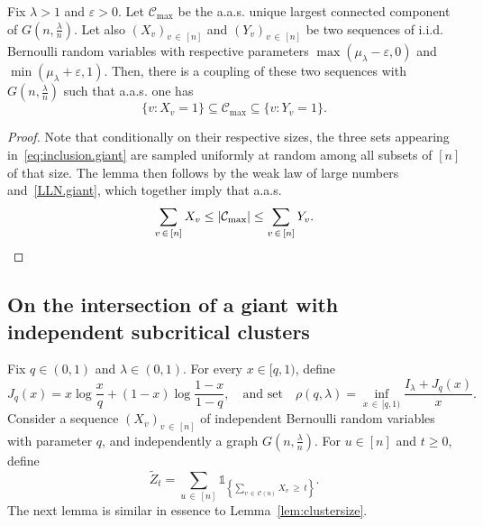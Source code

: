 \documentclass[AHL,Unicode,longabstracts,published]{cedram}
\newcommand{\cC}{\mathcal{C}}
\begin{document}
\begin{lemm}\label{lem:stoch.giant}
Fix $\lambda>1$ and $\varepsilon>0$. Let $\cC_{\max}$ be the a.a.s. unique largest connected component of $G(n,\frac \lambda n)$. Let also $(X_v)_{v\,\in\,[n]}$ and $(Y_v)_{v\,\in\,[n]}$ be two sequences of i.i.d. Bernoulli random variables with respective parameters $\max(\mu_\lambda-\varepsilon,0)$ and $\min(\mu_\lambda+\varepsilon,1)$. Then, there is a coupling of these two sequences with $G(n,\tfrac{\lambda}n)$ such that a.a.s. one has
\begin{equation}\label{eq:inclusion.giant}
\{v : X_v=1\} \subseteq \cC_{\max} \subseteq \{v : Y_v=1\}.
\end{equation}
\end{lemm}

\begin{proof}
Note that conditionally on their respective sizes, the three sets appearing in~\eqref{eq:inclusion.giant} are sampled uniformly at random among all subsets of $[n]$ of that size. The lemma then follows by the weak law of large numbers and~\eqref{LLN.giant}, which together imply that a.a.s.\
\[
\sum_{v\,\in\,[n]} X_v\le |\cC_{\max}|\le \sum_{v\,\in\,[n]} Y_v.\qedhere
\]
\end{proof}

\subsection{On the intersection of a giant with independent subcritical clusters}\label{sec.prel.intersection}
Fix $q\in (0,1)$ and $\lambda \in (0,1)$. For every $x\in [q,1)$, define
\[
J_q(x)= x\log \frac xq + (1-x)\log \frac{1-x}{1-q},\quad \text{and set}\quad \rho(q,\lambda) = \inf_{x\,\in\,[q,1)} \frac {I_\lambda+J_q(x)}{x}.
\]
Consider a sequence $(X_v)_{v\,\in\,[n]}$ of independent Bernoulli random variables with parameter $q$, and independently a graph $G(n,\tfrac {\lambda} n)$. For $u\in [n]$ and $t\ge 0$, define
\[
\widetilde Z_t = \sum_{u\,\in\,[n]} \mathds{1}_{\left\{\sum_{v\,\in\,\cC(u)} X_v\, \ge\, t\right\}}.
\]
The next lemma is similar in essence to Lemma~\ref{lem:clustersize}.
\end{document}
